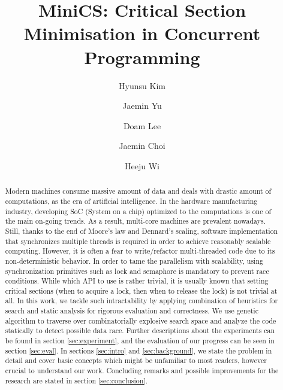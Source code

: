 \documentclass[sigconf]{acmart}
\begin{document}
\title{MiniCS: Critical Section Minimisation in Concurrent Programming}
\author{Hyunsu Kim}

\author{Jaemin Yu}

\author{Doam Lee}

\author{Jaemin Choi}

\author{Heeju Wi}

\begin{abstract}
Modern machines consume massive amount of data and deals with drastic amount of computations, as the era of artificial intelligence. In the hardware manufacturing industry, developing SoC (System on a chip) optimized to the computations is one of the main on-going trends. As a result, multi-core machines are prevalent nowadays. 
Still, thanks to the end of Moore's law and Dennard's scaling, software implementation that synchronizes multiple threads is required in order to achieve reasonably scalable computing. However, it is often a fear to write/refactor multi-threaded code due to its non-deterministic behavior. 
In order to tame the parallelism with scalability, using synchronization primitives such as lock and semaphore is mandatory to prevent race conditions. While which API to use is rather trivial, it is usually known that setting critical sections (when to acquire a lock, then when to release the lock) is not trivial at all. 
In this work, we tackle such intractability by applying combination of heuristics for search and static analysis for rigorous evaluation and correctness. We use genetic algorithm to traverse over combinatorially explosive search space and analyze the code statically to detect possible data race. Further descriptions about the experiments can be found in section \ref{sec:experiment}, and the evaluation of our progress can be seen in section \ref{sec:eval}. In sections \ref{sec:intro} and \ref{sec:background}, we state the problem in detail and cover basic concepts which might be unfamiliar to most readers, however crucial to understand our work. Concluding remarks and possible improvements for the research are stated in section \ref{sec:conclusion}.
\end{abstract}
\end{document}
